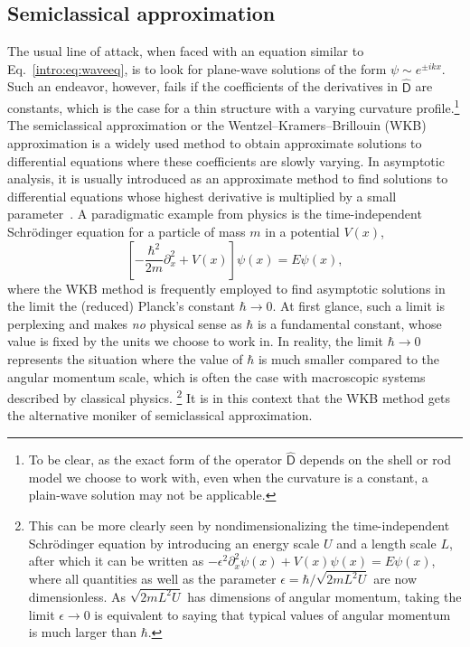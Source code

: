 \subsection{Semiclassical approximation}

The usual line of attack, when faced with an equation similar to Eq.~\eqref{intro:eq:waveeq}, is to look for plane-wave solutions of the form $\psi \sim e^{\pm i kx}$.
Such an endeavor, however, fails if the coefficients of the derivatives in $\widehat{\mathsf{D}}$ are constants, which is the case for a thin structure with a varying curvature profile.\footnote{To be clear, as the exact form of the operator $\widehat{\mathsf{D}}$ depends on the shell or rod model we choose to work with, even when the curvature is a constant, a plain-wave solution may not be applicable.}
The semiclassical approximation or the Wentzel--Kramers--Brillouin (WKB) approximation is a widely used method to obtain approximate solutions to differential equations where these coefficients are slowly varying.
In asymptotic analysis, it is usually introduced as an approximate method to find solutions to differential equations whose highest derivative is multiplied by a small parameter~\cite{bender1978}.
A paradigmatic example from physics is the time-independent Schr\"{o}dinger equation for a particle of mass $m$ in a potential $V(x)$,
%
\begin{equation}
  \left[-\frac{\hbar^{2}}{2m}\partial_{x}^{2} + V(x)\right]\psi(x) = E\psi(x),
\end{equation}
%
where the WKB method is frequently employed to find asymptotic solutions in the limit the (reduced) Planck's constant $\hbar \to 0$.
At first glance, such a limit is perplexing and makes \emph{no} physical sense as $\hbar$ is a fundamental constant, whose value is fixed by the units we choose to work in.
In reality, the limit $\hbar \to 0$ represents the situation where the value of $\hbar$ is much smaller compared to the angular momentum scale, which is often the case with macroscopic systems described by classical physics.%
\footnote{%
  This can be more clearly seen by nondimensionalizing the time-independent Schr\"{o}dinger equation by introducing an energy scale $U$ and a length scale $L$, after which it can be written as
$-\epsilon^{2}\partial_{{x}}^{2}\psi(x) + {V}(x)\psi(x) = {E}\psi(x)$,
where all quantities as well as the parameter $\epsilon = \hbar/\sqrt{2mL^{2}U}$ are now dimensionless.
As $\sqrt{2mL^{2}U}$ has dimensions of angular momentum, taking the limit $\epsilon \to 0$ is equivalent to saying that typical values of angular momentum is much larger than $\hbar$.}
It is in this context that the WKB method gets the alternative moniker of semiclassical approximation.%

